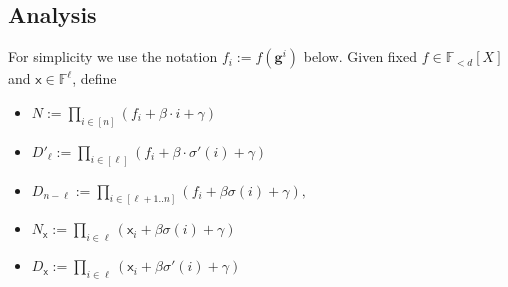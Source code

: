 \documentclass[11pt]{article} %
\newcommand{\F}{\ensuremath{\mathbb F}\xspace}
\newcommand{\defeq}{:=}
\newcommand{\inp}{\ensuremath{\mathsf{x}}\xspace}
\newcommand{\hgen}{\ensuremath{\mathbf{g}}\xspace}
\newcommand{\polysofdeg}[1]{\ensuremath{\F_{< #1}[X]}\xspace}
\begin{document}
\subsection{Analysis}


For simplicity we use the notation $f_i\defeq f(\hgen^{i})$ below.
Given fixed $f\in\polysofdeg{d}$ and $\inp\in \F^\ell$,
define
\begin{itemize}

\item $N \defeq \prod_{i\in [n]} (f_i + \beta\cdot i +\gamma)$
\item $D'_\ell \defeq \prod_{i\in [\ell]} (f_i + \beta\cdot \sigma'(i) +\gamma)$
\item $D_{n-\ell} \defeq \prod_{i\in [\ell+1..n]} (f_i + \beta\sigma(i) +\gamma),$
\item  $N_{\inp} \defeq \prod_{i\in \ell}(\inp_i + \beta\sigma(i) +\gamma)$
\item $D_{\inp} \defeq \prod_{i\in \ell}(\inp_i + \beta\sigma'(i) +\gamma)$

\end{itemize}
\end{document}
